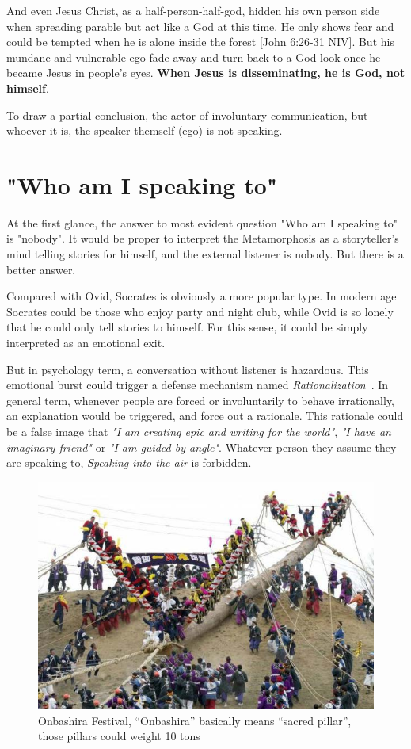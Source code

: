\documentclass[]{article}
\begin{document}
And even Jesus Christ, as a half-person-half-god, hidden his own person side when spreading parable but act like a God at this time. He only shows fear and could be tempted when he is alone inside the forest [John 6:26-31 NIV]. But his mundane and vulnerable ego fade away and turn back to a God look once he became Jesus in people's eyes. \textbf{When Jesus is disseminating, he is God, not himself}.

To draw a partial conclusion, the actor of involuntary communication, but whoever it is, the speaker themself (ego) is not speaking.

\section{"Who am I speaking to"}

At the first glance, the answer to most evident question "Who am I speaking to" is "nobody". It would be proper to interpret the Metamorphosis as a storyteller's mind telling stories for himself, and the external listener is nobody. But there is a better answer.   

Compared with Ovid, Socrates is obviously a more popular type. In modern age Socrates could be those who enjoy party and night club, while Ovid is so lonely that he could only tell stories to himself. For this sense, it could be simply interpreted as an emotional exit.

But in psychology term, a conversation without listener is hazardous. This emotional burst could trigger a defense mechanism named \textit{Rationalization}~\cite{simon2009understanding}. In general term, whenever people are forced or involuntarily to behave irrationally, an explanation would be triggered, and force out a rationale. This rationale could be a false image that \textit{"I am creating epic and writing for the world"}, \textit{"I have an imaginary friend"} or \textit{"I am guided by angle"}. Whatever person they assume they are speaking to, \textit{Speaking into the air} is forbidden.

\begin{figure}
	\centering
	\includegraphics[width=0.6\linewidth]{ritual}
	\caption{Onbashira Festival, “Onbashira” basically means “sacred pillar”, those pillars could weight 10 tons }
	\label{fig:pillar}
\end{figure}
\end{document}
